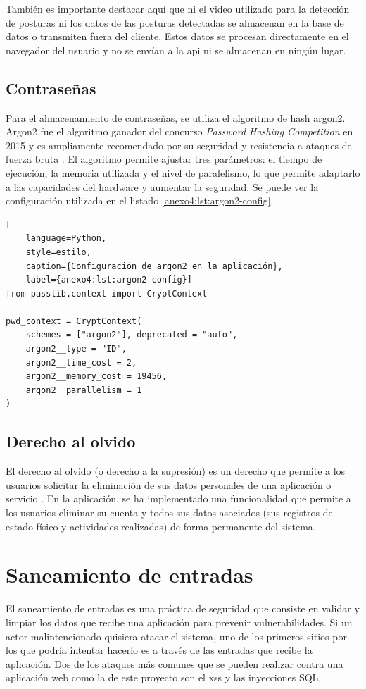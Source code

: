 También es importante destacar aquí que ni el video utilizado para la detección de posturas ni los
datos de las posturas detectadas se almacenan en la base de datos o transmiten fuera del cliente.
Estos datos se procesan directamente en el navegador del usuario y no se envían a la \gls{api} ni se almacenan
en ningún lugar.

\subsection{Contraseñas}
\label{anexo4:sec:contrasenas}
Para el almacenamiento de contraseñas, se utiliza el algoritmo de \gls{hash} argon2. Argon2 fue el
algoritmo ganador del concurso \textit{Password Hashing Competition} en 2015 y es ampliamente recomendado
por su seguridad y resistencia a ataques de fuerza bruta \parencite{OWASPPasswordStorage}. El algoritmo
permite ajustar tres parámetros: el tiempo de ejecución, la memoria utilizada y el nivel de paralelismo,
lo que permite adaptarlo a las capacidades del hardware y aumentar la seguridad. Se puede ver la configuración
utilizada en el listado \ref{anexo4:lst:argon2-config}.

\begin{lstlisting}[
    language=Python,
    style=estilo,
    caption={Configuración de argon2 en la aplicación},
    label={anexo4:lst:argon2-config}]
from passlib.context import CryptContext

pwd_context = CryptContext(
    schemes = ["argon2"], deprecated = "auto",
    argon2__type = "ID",
    argon2__time_cost = 2,
    argon2__memory_cost = 19456,
    argon2__parallelism = 1
)
\end{lstlisting}

\subsection{Derecho al olvido}
\label{anexo4:sec:derecho-al-olvido}
El derecho al olvido (o derecho a la supresión) es un derecho que permite a los
usuarios solicitar la eliminación de sus datos personales de una aplicación o
servicio \parencite{EuropeanParliament2016a}.  En la aplicación, se ha
implementado una funcionalidad que permite a los usuarios eliminar su cuenta y
todos sus datos asociados (sus registros de estado físico y actividades
realizadas) de forma permanente del sistema.

\section{Saneamiento de entradas}
\label{anexo4:sec:saneamiento-entradas}
El saneamiento de entradas es una práctica de seguridad que consiste en validar y limpiar los datos
que recibe una aplicación para prevenir vulnerabilidades. Si un actor malintencionado quisiera
atacar el sistema, uno de los primeros sitios por los que podría intentar hacerlo es a través
de las entradas que recibe la aplicación. Dos de los ataques más comunes que se pueden realizar
contra una aplicación web como la de este proyecto son el \gls{xss} y las inyecciones SQL.

